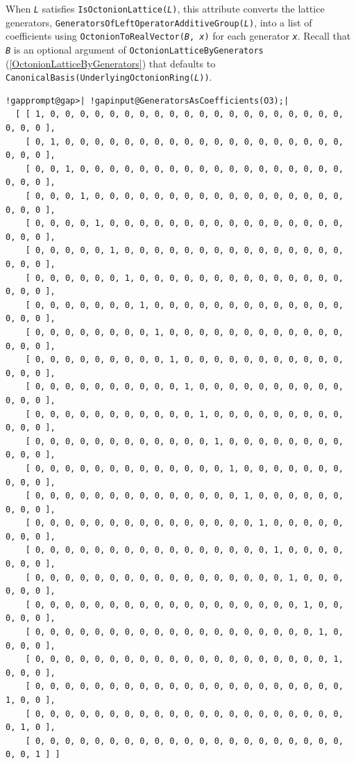 \documentclass[a4paper,11pt]{report}
\begin{document}
{{{ When \mbox{\texttt{\mdseries\slshape L}} satisfies \texttt{IsOctonionLattice(\mbox{\texttt{\mdseries\slshape L}})}, this attribute converts the lattice generators, \texttt{GeneratorsOfLeftOperatorAdditiveGroup(\mbox{\texttt{\mdseries\slshape L}})}, into a list of coefficients using \texttt{OctonionToRealVector(\mbox{\texttt{\mdseries\slshape B}}, \mbox{\texttt{\mdseries\slshape x}})} for each generator \mbox{\texttt{\mdseries\slshape x}}. Recall that \mbox{\texttt{\mdseries\slshape B}} is an optional argument of \texttt{OctonionLatticeByGenerators} (\ref{OctonionLatticeByGenerators}) that defaults to \texttt{CanonicalBasis(UnderlyingOctonionRing(\mbox{\texttt{\mdseries\slshape L}}))}. 
\begin{Verbatim}[commandchars=!@|,fontsize=\small,frame=single,label=Example]
  !gapprompt@gap>| !gapinput@GeneratorsAsCoefficients(O3);|
  [ [ 1, 0, 0, 0, 0, 0, 0, 0, 0, 0, 0, 0, 0, 0, 0, 0, 0, 0, 0, 0, 0, 0, 0, 0 ],
    [ 0, 1, 0, 0, 0, 0, 0, 0, 0, 0, 0, 0, 0, 0, 0, 0, 0, 0, 0, 0, 0, 0, 0, 0 ],
    [ 0, 0, 1, 0, 0, 0, 0, 0, 0, 0, 0, 0, 0, 0, 0, 0, 0, 0, 0, 0, 0, 0, 0, 0 ],
    [ 0, 0, 0, 1, 0, 0, 0, 0, 0, 0, 0, 0, 0, 0, 0, 0, 0, 0, 0, 0, 0, 0, 0, 0 ],
    [ 0, 0, 0, 0, 1, 0, 0, 0, 0, 0, 0, 0, 0, 0, 0, 0, 0, 0, 0, 0, 0, 0, 0, 0 ],
    [ 0, 0, 0, 0, 0, 1, 0, 0, 0, 0, 0, 0, 0, 0, 0, 0, 0, 0, 0, 0, 0, 0, 0, 0 ],
    [ 0, 0, 0, 0, 0, 0, 1, 0, 0, 0, 0, 0, 0, 0, 0, 0, 0, 0, 0, 0, 0, 0, 0, 0 ],
    [ 0, 0, 0, 0, 0, 0, 0, 1, 0, 0, 0, 0, 0, 0, 0, 0, 0, 0, 0, 0, 0, 0, 0, 0 ],
    [ 0, 0, 0, 0, 0, 0, 0, 0, 1, 0, 0, 0, 0, 0, 0, 0, 0, 0, 0, 0, 0, 0, 0, 0 ],
    [ 0, 0, 0, 0, 0, 0, 0, 0, 0, 1, 0, 0, 0, 0, 0, 0, 0, 0, 0, 0, 0, 0, 0, 0 ],
    [ 0, 0, 0, 0, 0, 0, 0, 0, 0, 0, 1, 0, 0, 0, 0, 0, 0, 0, 0, 0, 0, 0, 0, 0 ],
    [ 0, 0, 0, 0, 0, 0, 0, 0, 0, 0, 0, 1, 0, 0, 0, 0, 0, 0, 0, 0, 0, 0, 0, 0 ],
    [ 0, 0, 0, 0, 0, 0, 0, 0, 0, 0, 0, 0, 1, 0, 0, 0, 0, 0, 0, 0, 0, 0, 0, 0 ],
    [ 0, 0, 0, 0, 0, 0, 0, 0, 0, 0, 0, 0, 0, 1, 0, 0, 0, 0, 0, 0, 0, 0, 0, 0 ],
    [ 0, 0, 0, 0, 0, 0, 0, 0, 0, 0, 0, 0, 0, 0, 1, 0, 0, 0, 0, 0, 0, 0, 0, 0 ],
    [ 0, 0, 0, 0, 0, 0, 0, 0, 0, 0, 0, 0, 0, 0, 0, 1, 0, 0, 0, 0, 0, 0, 0, 0 ],
    [ 0, 0, 0, 0, 0, 0, 0, 0, 0, 0, 0, 0, 0, 0, 0, 0, 1, 0, 0, 0, 0, 0, 0, 0 ],
    [ 0, 0, 0, 0, 0, 0, 0, 0, 0, 0, 0, 0, 0, 0, 0, 0, 0, 1, 0, 0, 0, 0, 0, 0 ],
    [ 0, 0, 0, 0, 0, 0, 0, 0, 0, 0, 0, 0, 0, 0, 0, 0, 0, 0, 1, 0, 0, 0, 0, 0 ],
    [ 0, 0, 0, 0, 0, 0, 0, 0, 0, 0, 0, 0, 0, 0, 0, 0, 0, 0, 0, 1, 0, 0, 0, 0 ],
    [ 0, 0, 0, 0, 0, 0, 0, 0, 0, 0, 0, 0, 0, 0, 0, 0, 0, 0, 0, 0, 1, 0, 0, 0 ],
    [ 0, 0, 0, 0, 0, 0, 0, 0, 0, 0, 0, 0, 0, 0, 0, 0, 0, 0, 0, 0, 0, 1, 0, 0 ],
    [ 0, 0, 0, 0, 0, 0, 0, 0, 0, 0, 0, 0, 0, 0, 0, 0, 0, 0, 0, 0, 0, 0, 1, 0 ],
    [ 0, 0, 0, 0, 0, 0, 0, 0, 0, 0, 0, 0, 0, 0, 0, 0, 0, 0, 0, 0, 0, 0, 0, 1 ] ]
\end{Verbatim}
 }

}}
\end{document}
